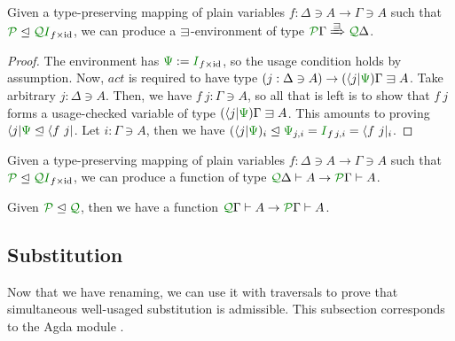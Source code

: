 \documentclass[submission,copyright,creativecommons]{eptcs}
\begin{document}
\begin{lemma}\label{lem:ren-env}
  Given a type-preserving mapping of plain variables
  $f : \Delta \ni A \to \Gamma \ni A$ such that
  $\resctx P \subres \resctx Q\rescomment I_{f\times\id}$,
  we can produce a $\lvar$-environment of type
  $\ctx{\Gamma}{P} \subst{\lvar} \ctx{\Delta}{Q}$.
\end{lemma}
\begin{proof}
  The environment has $\rescomment\Psi := \rescomment I_{f\times\id}$,
  so the usage condition holds by assumption.
  Now, $\mathit{act}$ is required to have type
  $(j : \Delta \ni A) \to (\langle j \rvert\rescomment\Psi)\Gamma \lvar A$.
  Take arbitrary $j : \Delta \ni A$.
  Then, we have $f~j : \Gamma \ni A$, so all that is left is to show that $f~j$
  forms a usage-checked variable of type
  $(\langle j \rvert\rescomment\Psi)\Gamma \lvar A$.
  This amounts to proving
  $\langle j \rvert\rescomment\Psi \subres \langle f~j \rvert$.
  Let $i : \Gamma \ni A$, then we have
    $(\langle j \rvert\rescomment\Psi)_i
    \subres \rescomment\Psi_{j,i}
    = \rescomment I_{f\,j,i}
    = \langle f~j \rvert_i$.
\end{proof}

\begin{corollary}\label{cor:ren}
  Given a type-preserving mapping of plain variables
  $f : \Delta \ni A \to \Gamma \ni A$ such that
  $\resctx P \subres \resctx Q\rescomment I_{f\times\id}$,
  we can produce a function of type
  $\ctx{\Delta}{Q} \vdash A \to \ctx{\Gamma}{P} \vdash A$.
\end{corollary}

\begin{corollary}\label{cor:subusage}
  Given $\resctx P \subres \resctx Q$, then we have a function
  $\ctx{\Gamma}{Q} \vdash A \to \ctx{\Gamma}{P} \vdash A$.
\end{corollary}

\subsection{Substitution}

Now that we have renaming, we can use it with traversals to prove that
simultaneous well-usaged substitution is admissible. This subsection
corresponds to the Agda module
.
\end{document}
